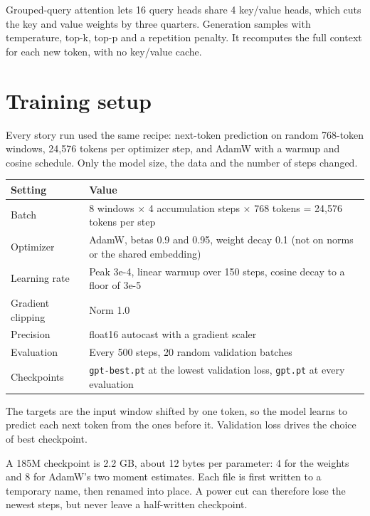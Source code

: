 \documentclass[11pt,a4paper]{article}
\newcommand{\code}[1]{\texttt{#1}}
\begin{document}
Grouped-query attention lets 16 query heads share 4 key/value heads, which cuts the key and value weights by three quarters. Generation samples with temperature, top-k, top-p and a repetition penalty. It recomputes the full context for each new token, with no key/value cache.

\section*{Training setup}
{}

Every story run used the same recipe: next-token prediction on random 768-token windows, 24,576 tokens per optimizer step, and AdamW with a warmup and cosine schedule. Only the model size, the data and the number of steps changed.

{\small
\begin{longtable}{@{}>{\raggedright\arraybackslash\hspace{0pt}}p{}>{\raggedright\arraybackslash\hspace{0pt}}p{}@{}}
\toprule
\textbf{Setting} & \textbf{Value} \\
\midrule
\endhead
Batch & 8 windows $\times$ 4 accumulation steps $\times$ 768 tokens = 24,576 tokens per step \\
Optimizer & AdamW, betas 0.9 and 0.95, weight decay 0.1 (not on norms or the shared embedding) \\
Learning rate & Peak 3e-4, linear warmup over 150 steps, cosine decay to a floor of 3e-5 \\
Gradient clipping & Norm 1.0 \\
Precision & float16 autocast with a gradient scaler \\
Evaluation & Every 500 steps, 20 random validation batches \\
Checkpoints & \code{gpt-\allowbreak{}best.\allowbreak{}pt} at the lowest validation loss, \code{gpt.\allowbreak{}pt} at every evaluation \\
\bottomrule
\end{longtable}
}

The targets are the input window shifted by one token, so the model learns to predict each next token from the ones before it. Validation loss drives the choice of best checkpoint.

A 185M checkpoint is 2.2 GB, about 12 bytes per parameter: 4 for the weights and 8 for AdamW's two moment estimates. Each file is first written to a temporary name, then renamed into place. A power cut can therefore lose the newest steps, but never leave a half-written checkpoint.
\end{document}
